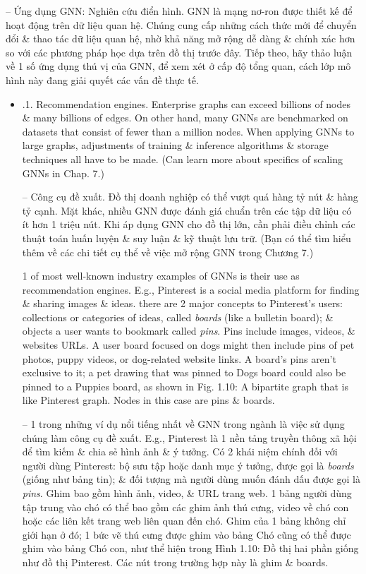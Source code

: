 \documentclass{article}
\begin{document}
\begin{itemize}
\begin{itemize}
        -- {\sf Ứng dụng GNN: Nghiên cứu điển hình.} GNN là mạng nơ-ron được thiết kế để hoạt động trên dữ liệu quan hệ. Chúng cung cấp những cách thức mới để chuyển đổi \& thao tác dữ liệu quan hệ, nhờ khả năng mở rộng dễ dàng \& chính xác hơn so với các phương pháp học dựa trên đồ thị trước đây. Tiếp theo, hãy thảo luận về 1 số ứng dụng thú vị của GNN, để xem xét ở cấp độ tổng quan, cách lớp mô hình này đang giải quyết các vấn đề thực tế.
        \begin{itemize}
            \item {.1. Recommendation engines.} Enterprise graphs can exceed billions of nodes \& many billions of edges. On other hand, many GNNs are benchmarked on datasets that consist of fewer than a million nodes. When applying GNNs to large graphs, adjustments of training \& inference algorithms \& storage techniques all have to be made. (Can learn more about specifics of scaling GNNs in Chap. 7.)

            -- {\sf Công cụ đề xuất.} Đồ thị doanh nghiệp có thể vượt quá hàng tỷ nút \& hàng tỷ cạnh. Mặt khác, nhiều GNN được đánh giá chuẩn trên các tập dữ liệu có ít hơn 1 triệu nút. Khi áp dụng GNN cho đồ thị lớn, cần phải điều chỉnh các thuật toán huấn luyện \& suy luận \& kỹ thuật lưu trữ. (Bạn có thể tìm hiểu thêm về các chi tiết cụ thể về việc mở rộng GNN trong Chương 7.)

            1 of most well-known industry examples of GNNs is their use as recommendation engines. E.g., Pinterest is a social media platform for finding \& sharing images \& ideas. there are 2 major concepts to Pinterest's users: collections or categories of ideas, called {\it boards}  (like a bulletin board); \& objects a user wants to bookmark called {\it pins}. Pins include images, videos, \& websites URLs. A user board focused on dogs might then include pins of pet photos, puppy videos, or dog-related website links. A board's pins aren't exclusive to it; a pet drawing that was pinned to Dogs board could also be pinned to a Puppies board, as shown in {\sf Fig. 1.10: A bipartite graph that is like Pinterest graph. Nodes in this case are pins \& boards}.

            -- 1 trong những ví dụ nổi tiếng nhất về GNN trong ngành là việc sử dụng chúng làm công cụ đề xuất. E.g., Pinterest là 1 nền tảng truyền thông xã hội để tìm kiếm \& chia sẻ hình ảnh \& ý tưởng. Có 2 khái niệm chính đối với người dùng Pinterest: bộ sưu tập hoặc danh mục ý tưởng, được gọi là {\it boards} (giống như bảng tin); \& đối tượng mà người dùng muốn đánh dấu được gọi là {\it pins}. Ghim bao gồm hình ảnh, video, \& URL trang web. 1 bảng người dùng tập trung vào chó có thể bao gồm các ghim ảnh thú cưng, video về chó con hoặc các liên kết trang web liên quan đến chó. Ghim của 1 bảng không chỉ giới hạn ở đó; 1 bức vẽ thú cưng được ghim vào bảng Chó cũng có thể được ghim vào bảng Chó con, như thể hiện trong {\sf Hình 1.10: Đồ thị hai phần giống như đồ thị Pinterest. Các nút trong trường hợp này là ghim \& boards}.


\end{itemize}
\end{itemize}
\end{itemize}
\end{document}
